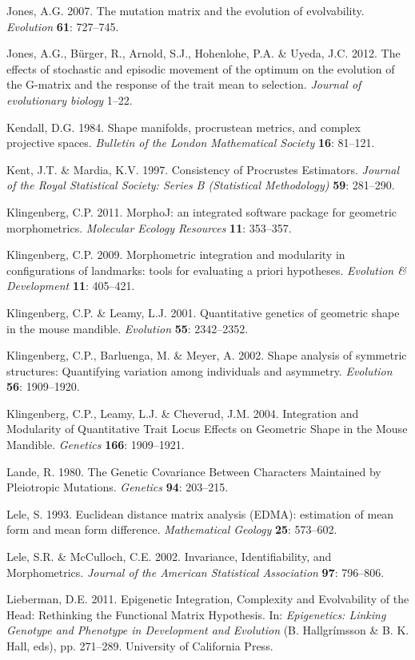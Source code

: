 \documentclass[12pt,]{article}
\begin{document}
Jones, A.G. 2007. The mutation matrix and the evolution of evolvability.
\emph{Evolution} \textbf{61}: 727--745.

Jones, A.G., Bürger, R., Arnold, S.J., Hohenlohe, P.A. \& Uyeda, J.C.
2012. The effects of stochastic and episodic movement of the optimum on
the evolution of the G-matrix and the response of the trait mean to
selection. \emph{Journal of evolutionary biology} 1--22.

Kendall, D.G. 1984. Shape manifolds, procrustean metrics, and complex
projective spaces. \emph{Bulletin of the London Mathematical Society}
\textbf{16}: 81--121.

Kent, J.T. \& Mardia, K.V. 1997. Consistency of Procrustes Estimators.
\emph{Journal of the Royal Statistical Society: Series B (Statistical
Methodology)} \textbf{59}: 281--290.

Klingenberg, C.P. 2011. MorphoJ: an integrated software package for
geometric morphometrics. \emph{Molecular Ecology Resources} \textbf{11}:
353--357.

Klingenberg, C.P. 2009. Morphometric integration and modularity in
configurations of landmarks: tools for evaluating a priori hypotheses.
\emph{Evolution \& Development} \textbf{11}: 405--421.

Klingenberg, C.P. \& Leamy, L.J. 2001. Quantitative genetics of
geometric shape in the mouse mandible. \emph{Evolution} \textbf{55}:
2342--2352.

Klingenberg, C.P., Barluenga, M. \& Meyer, A. 2002. Shape analysis of
symmetric structures: Quantifying variation among individuals and
asymmetry. \emph{Evolution} \textbf{56}: 1909--1920.

Klingenberg, C.P., Leamy, L.J. \& Cheverud, J.M. 2004. Integration and
Modularity of Quantitative Trait Locus Effects on Geometric Shape in the
Mouse Mandible. \emph{Genetics} \textbf{166}: 1909--1921.

Lande, R. 1980. The Genetic Covariance Between Characters Maintained by
Pleiotropic Mutations. \emph{Genetics} \textbf{94}: 203--215.

Lele, S. 1993. Euclidean distance matrix analysis (EDMA): estimation of
mean form and mean form difference. \emph{Mathematical Geology}
\textbf{25}: 573--602.

Lele, S.R. \& McCulloch, C.E. 2002. Invariance, Identifiability, and
Morphometrics. \emph{Journal of the American Statistical Association}
\textbf{97}: 796--806.

Lieberman, D.E. 2011. Epigenetic Integration, Complexity and
Evolvability of the Head: Rethinking the Functional Matrix Hypothesis.
In: \emph{Epigenetics: Linking Genotype and Phenotype in Development and
Evolution} (B. Hallgrímsson \& B. K. Hall, eds), pp. 271--289.
University of California Press.
\end{document}
